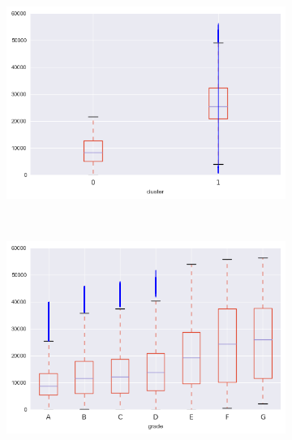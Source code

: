 \begin{anexosenv}
\begin{figure}[t!]
\begin{subfigure}[t]{0.5\textwidth}
            \centerline{\includegraphics[width=1\textwidth]{img/total_pymnt_inv_by_cluster}}
        \end{subfigure}%
        ~ 
        \begin{subfigure}[t]{0.5\textwidth}
            \centering
   
            \centerline{\includegraphics[width=1\textwidth]{img/total_pymnt_inv_by_grade}}

        \end{subfigure}
        \\
                \caption{last\textunderscore pymnt\textunderscore amnt}
        \begin{subfigure}[t]{0.5\textwidth}
            \centering


\end{subfigure}
\end{figure}
\end{anexosenv}
